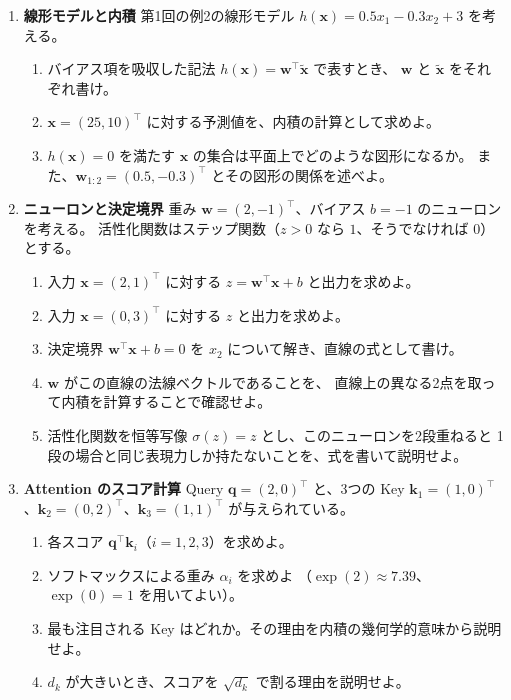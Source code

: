 \begin{enumerate}
  \item \textbf{線形モデルと内積}\quad
    第1回の例2の線形モデル $h(\bm{x}) = 0.5 x_1 - 0.3 x_2 + 3$ を考える。
    \begin{enumerate}
      \item バイアス項を吸収した記法 $h(\bm{x}) = \bm{w}^\top \tilde{\bm{x}}$ で表すとき、
        $\bm{w}$ と $\tilde{\bm{x}}$ をそれぞれ書け。
      \item $\bm{x} = (25, 10)^\top$ に対する予測値を、内積の計算として求めよ。
      \item $h(\bm{x}) = 0$ を満たす $\bm{x}$ の集合は平面上でどのような図形になるか。
        また、$\bm{w}_{1:2} = (0.5, -0.3)^\top$ とその図形の関係を述べよ。
    \end{enumerate}

  \item \textbf{ニューロンと決定境界}\quad
    重み $\bm{w} = (2, -1)^\top$、バイアス $b = -1$ のニューロンを考える。
    活性化関数はステップ関数（$z > 0$ なら $1$、そうでなければ $0$）とする。
    \begin{enumerate}
      \item 入力 $\bm{x} = (2, 1)^\top$ に対する $z = \bm{w}^\top \bm{x} + b$ と出力を求めよ。
      \item 入力 $\bm{x} = (0, 3)^\top$ に対する $z$ と出力を求めよ。
      \item 決定境界 $\bm{w}^\top \bm{x} + b = 0$ を $x_2$ について解き、直線の式として書け。
      \item $\bm{w}$ がこの直線の法線ベクトルであることを、
        直線上の異なる2点を取って内積を計算することで確認せよ。
      \item 活性化関数を恒等写像 $\sigma(z) = z$ とし、このニューロンを2段重ねると
        1段の場合と同じ表現力しか持たないことを、式を書いて説明せよ。
    \end{enumerate}

  \item \textbf{Attention のスコア計算}\quad
    Query $\bm{q} = (2, 0)^\top$ と、3つの Key
    $\bm{k}_1 = (1, 0)^\top$、$\bm{k}_2 = (0, 2)^\top$、$\bm{k}_3 = (1, 1)^\top$ が与えられている。
    \begin{enumerate}
      \item 各スコア $\bm{q}^\top \bm{k}_i$（$i = 1, 2, 3$）を求めよ。
      \item ソフトマックスによる重み $\alpha_i$ を求めよ
        （$\exp(2) \approx 7.39$、$\exp(0) = 1$ を用いてよい）。
      \item 最も注目される Key はどれか。その理由を内積の幾何学的意味から説明せよ。
      \item $d_k$ が大きいとき、スコアを $\sqrt{d_k}$ で割る理由を説明せよ。
    \end{enumerate}
\end{enumerate}



